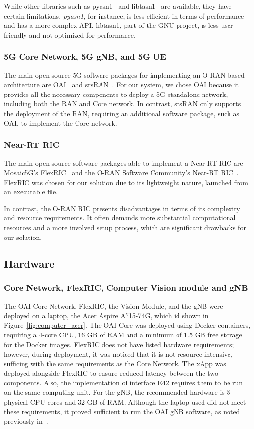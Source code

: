 While other libraries such as pyasn1~\cite{pyasn1} and libtasn1~\cite{libtasn1} are available, they have certain limitations.
\emph{pyasn1}, for instance, is less efficient in terms of performance and has a more complex API\@.
libtasn1, part of the GNU project, is less user-friendly and not optimized for performance.


\subsubsection{5G Core Network, 5G gNB, and 5G UE}
The main open-source 5G software packages for implementing an O-RAN based architecture are OAI~\cite{openairinterface} and srsRAN~\cite{srslte}.
For our system, we chose OAI because it provides all the necessary components to deploy a 5G standalone network, including both the RAN and Core network.
In contrast, srsRAN only supports the deployment of the RAN, requiring an additional software package, such as OAI, to implement the Core network.

\subsubsection{Near-RT RIC}
The main open-source software packages able to implement a Near-RT RIC are Mosaic5G’s FlexRIC~\cite{flexric} and the O-RAN Software Community’s Near-RT RIC~\cite{oran-sc}.
FlexRIC was chosen for our solution due to its lightweight nature, launched from an executable file.

In contrast, the O-RAN RIC presents disadvantages in terms of its complexity and resource requirements.
It often demands more substantial computational resources and a more involved setup process, which are significant drawbacks for our solution.

\subsection{Hardware}\label{subsec:hardware}


\subsubsection{Core Network, FlexRIC, Computer Vision module and gNB}
The OAI Core Network, FlexRIC, the Vision Module, and the gNB were deployed on a laptop, the Acer Aspire A715-74G, which id shown in Figure~\ref{fig:computer_acer}.
The OAI Core was deployed using Docker containers, requiring a 4-core CPU, 16 GB of RAM and a minimum of 1.5 GB free storage for the Docker images.
FlexRIC does not have listed hardware requirements; however, during deployment, it was noticed that it is not resource-intensive, sufficing with the same requirements as the Core Network.
The xApp was deployed alongside FlexRIC to ensure reduced latency between the two components.
Also,  the implementation of interface E42 requires them to be run on the same computing unit.
For the gNB, the recommended hardware is 8 physical CPU cores and 32 GB of RAM\@.
Although the laptop used did not meet these requirements, it proved sufficient to run the OAI gNB software, as noted previously in~\cite{queiros2023autonomous}.

